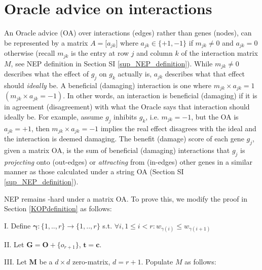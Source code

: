 

\newpage
\section{Oracle advice on interactions}\label{matrix_OA}
        An Oracle advice (OA) over interactions (edges) rather than genes (nodes), can be represented by a matrix $A=\big [a_{jk}\big ]$ where  $a_{jk}\in\{+1,-1\}$ if $m_{jk}\neq 0$ and $a_{jk}=0$ otherwise (recall $m_{jk}$ is the entry at row $j$ and column $k$ of the interaction matrix $M$, see NEP definition in Section SI \ref{sup_NEP_definition}).  While $m_{jk}\neq 0$ describes what the effect of $g_j$  on $g_k$ actually is, $a_{jk}$ describes what that effect should \textit{ideally} be. A beneficial (damaging) interaction is one where $m_{jk} \times a_{jk} = 1 $ $(m_{jk}\times a_{jk}=-1)$. In other words, an interaction is beneficial (damaging) if it is in agreement (disagreement) with what the Oracle says that interaction should ideally be.  For example, assume $g_j$ inhibits $g_k$, i.e. $m_{jk}=-1$,  but the OA is $a_{jk}=+1$, then $m_{jk}\times a_{jk}=-1$ implies the real effect disagrees with the ideal and the interaction is deemed damaging. The benefit (damage) score of each gene $g_j$, given a matrix OA, is the sum of beneficial (damaging) interactions that $g_j$ is \textit{projecting} onto (out-edges) or \textit{attracting} from (in-edges) other genes in a similar manner as those calculated under a string OA (Section SI \ref{sup_NEP_definition}).

        NEP remains -hard under a matrix OA. To prove this, we modify the proof in  Section  \ref{KOPdefinition} as follows:


            \vspace{5pt}

            \noindent I. Define $\boldsymbol{\gamma}:\{1,..,r\}\rightarrow \{1,..,r\}$ \mys s.t. $\forall i, 1\leq i <r: w_{\gamma(i)} \leq w_{\gamma(i+1)}$


            \noindent II. Let $\boldsymbol{G}=\boldsymbol{O}+\{o_{r+1}\}$, \mys $\boldsymbol{t}=\boldsymbol{c}$.

            \noindent III. Let $\boldsymbol  {M}$ \mys be a $d\times d$ zero-matrix, $d=r+1$. Populate $M$ as follows:

